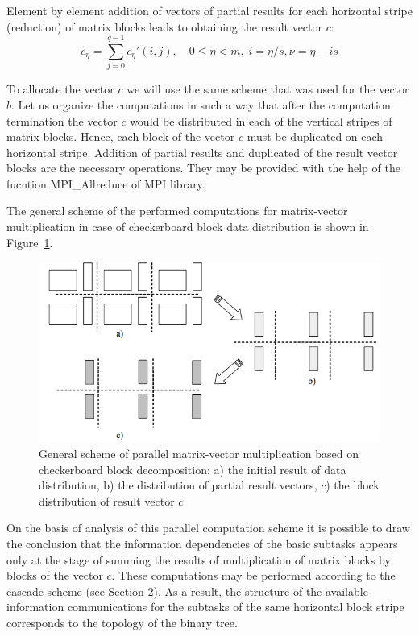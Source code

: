 Element by element addition of vectors of partial results for each horizontal stripe (reduction) of matrix blocks leads to obtaining the result vector $c$:
\begin{equation}
  c_\eta = \sum_{j=0}^{q-1} c_\eta ' (i,j), \quad 0\leq \eta <m, \; i=\eta /s, \nu = \eta -i s
\end{equation}

To allocate the vector $c$ we will use the same scheme that was used for the vector $b$. Let us organize the computations in such a way that after the computation termination the vector $c$ would be distributed in each of the vertical stripes of matrix blocks. Hence, each block of the vector $c$ must be duplicated on each horizontal stripe. Addition of partial results and duplicated of the result vector blocks are the necessary operations. They may be provided with the help of the fucntion MPI\_Allreduce of MPI library.

The general scheme of the performed computations for matrix-vector multiplication in case of checkerboard
block data distribution is shown in Figure~\ref{fig:blockdist}.

\begin{figure}[htbp]
  \centering
  \includegraphics[width=.9\textwidth]{illustrations/matrix-vector-product/block.png}
  \caption{General scheme of parallel matrix-vector multiplication based on checkerboard block decomposition: a) the initial result of data distribution, b) the distribution of partial result vectors, $c$) the block distribution of result vector $c$}
  \label{fig:blockdist}
\end{figure}

On the basis of analysis of this parallel computation scheme it is possible to draw the conclusion that the information dependencies of the basic subtasks appears only at the stage of summing the results of multiplication of matrix blocks by blocks of the vector $c$. These computations may be performed according to the cascade scheme (see Section 2). As a result, the structure of the available information communications for the subtasks of the same horizontal block stripe corresponds to the topology of the binary tree.

